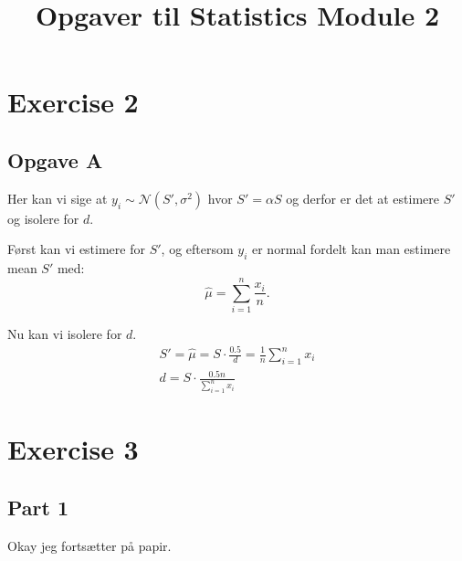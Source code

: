\title{Opgaver til Statistics Module 2}

\section{Exercise 2}

\subsection{Opgave A}

Her kan vi sige at $y_i \sim \mathcal{N}(S', \sigma^2)$ hvor $S' = \alpha S$ og derfor er det at estimere $S'$ og isolere for $d$.

Først kan vi estimere for $S'$, og eftersom $y_i$ er normal fordelt kan man estimere mean $S'$ med: \[
    \hat{\mu} = \sum_{i=1}^{n} \frac {x_i} n
.\] 

Nu kan vi isolere for $d$.
\begin{align*}
    S' = \hat{\mu} = S \cdot \frac {0.5} d = \frac 1 n \sum_{i=1}^{n} x_i \\
    d = S \cdot \frac{0.5 n}{\sum_{i=1}^{n} x_i}
\end{align*}

\section{Exercise 3}

\subsection{Part 1}

Okay jeg fortsætter på papir.
